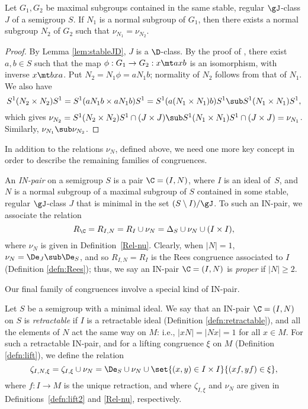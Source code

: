 \begin{lemma}\label{lem:G1G2}
Let $G_1,G_2$ be maximal subgroups contained in the same stable, regular $\gJ$-class $J$ of a semigroup $S$.  If $N_1$ is a normal subgroup of $G_1$, then there exists a normal subgroup $N_2$ of $G_2$ such that $\nu_{N_1}=\nu_{N_2}$.
\end{lemma}

\begin{proof}
By Lemma \ref{lem:stableJD}, $J$ is a $\D$-class.
By the proof of \cite[Proposition 2.3.6]{Howie}, there exist $a,b\in S$ such that the map ${\phi:G_1\to G_2:x\mt axb}$ is an isomorphism, with inverse $x\mt bxa$.  
Put $N_2=N_1\phi=aN_1b$; normality of $N_2$ follows from that of $N_1$.  We also have
\[
S^1(N_2\times N_2)S^1 = S^1(aN_1b\times aN_1b)S^1 = S^1(a(N_1\times N_1)b)S^1 \sub S^1(N_1\times N_1)S^1,
\]
which gives $\nu_{N_2} = S^1(N_2\times N_2)S^1 \cap (J\times J) \sub S^1(N_1\times N_1)S^1 \cap (J\times J) = \nu_{N_1}$.  Similarly, $\nu_{N_1}\sub\nu_{N_2}$.
\end{proof}

In addition to the relations $\nu_N$, defined above, we need one more key concept in order to describe the remaining families of congruences.

\begin{definition}
\label{defn:RC}
  An \emph{IN-pair} on a semigroup $S$ is a pair $\C=(I,N)$, where
  $I$ is an ideal of~$S$, and $N$ is a normal subgroup of a maximal subgroup of
  $S$ contained in some stable, regular $\gJ$-class $J$ that is minimal in the set
  $(S\setminus I)/{\gJ}$.
  To such an IN-pair, we associate the relation
  \[
  R_\C = R_{I,N} = R_I\cup\nu_N=\Delta_S \cup \nu_N \cup (I\times I),
  \]
  where $\nu_N$ is given in Definition~\ref{Rel-nu}. 
%
Clearly, when $|N|=1$, $\nu_N=\De_J\sub\De_S$, and so $R_{I,N}=R_I$ is the Rees congruence associated to $I$ (Definition \ref{defn:Rees}); thus, we say an IN-pair $\C=(I,N)$ is \emph{proper} if $|N|\geq2$.
\end{definition}


Our final family of congruences involve a special kind of IN-pair.

\begin{definition}
\label{defn:lrmC0}
Let $S$ be a semigroup with a minimal ideal.
  We say that an IN-pair $\C=(I,N)$ on $S$ is
  \emph{retractable} if $I$ is a retractable ideal (Definition \ref{defn:retractable}), and all the elements of $N$ act the same way on $M$: i.e., $|xN|=|Nx|=1$ for all $x\in M$.
  For such a retractable IN-pair, and for a lifting congruence $\xi$ on $M$ (Definition \ref{defn:lift}), we
  define the relation
\[
\zeta_{I,N,\xi} = \zeta_{I,\xi}\cup\nu_N = \De_S\cup\nu_N\cup\set{(x,y)\in I\times I}{(xf,yf) \in \xi},
\]
where $f:I\to M$ is the unique retraction, and where $\zeta_{I, \xi}$ and $\nu_N$ are given in Definitions~\ref{defn:lift2} and \ref{Rel-nu}, respectively.
\end{definition}


